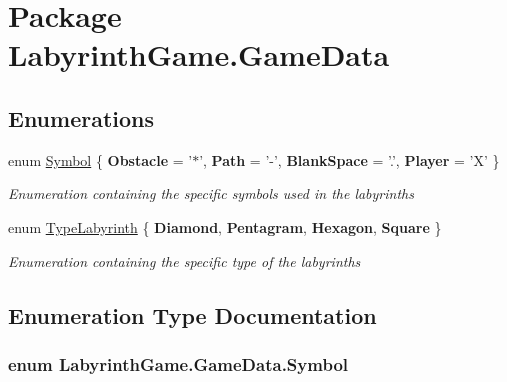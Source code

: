 \hypertarget{namespace_labyrinth_game_1_1_game_data}{\section{Package Labyrinth\+Game.\+Game\+Data}
\label{namespace_labyrinth_game_1_1_game_data}
}
\subsection*{Enumerations}
\begin{DoxyCompactItemize}
\item 
enum \hyperlink{namespace_labyrinth_game_1_1_game_data_a669d2cc2c6f5f970d09157d0b7fd6c70}{Symbol} \{ {\bfseries Obstacle} = '$\ast$', 
{\bfseries Path} = '-\/', 
{\bfseries Blank\+Space} = '.', 
{\bfseries Player} = 'X'
 \}
\begin{DoxyCompactList}\small\item\em Enumeration containing the specific symbols used in the labyrinths \end{DoxyCompactList}\item 
enum \hyperlink{namespace_labyrinth_game_1_1_game_data_a911877be7f3c2eb330b648e52945476c}{Type\+Labyrinth} \{ {\bfseries Diamond}, 
{\bfseries Pentagram}, 
{\bfseries Hexagon}, 
{\bfseries Square}
 \}
\begin{DoxyCompactList}\small\item\em Enumeration containing the specific type of the labyrinths \end{DoxyCompactList}\end{DoxyCompactItemize}


\subsection{Enumeration Type Documentation}
\hypertarget{namespace_labyrinth_game_1_1_game_data_a669d2cc2c6f5f970d09157d0b7fd6c70}{
\subsubsection[{Symbol}]{\setlength{\rightskip}{0pt plus 5cm}enum {\bf Labyrinth\+Game.\+Game\+Data.\+Symbol}}}\label{namespace_labyrinth_game_1_1_game_data_a669d2cc2c6f5f970d09157d0b7fd6c70}



